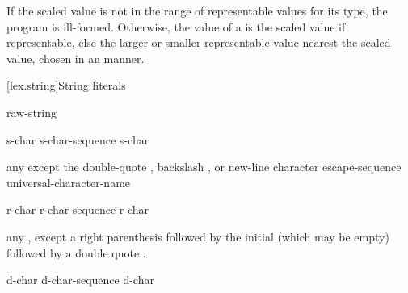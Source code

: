 \documentclass{wg21}
\begin{document}
\pnum
If the scaled value is not in the range of representable
values for its type, the program is ill-formed.
Otherwise, the value of a 
is the scaled value if representable,
else the larger or smaller representable value nearest the scaled value,
chosen in an  manner.

[lex.string]{String literals}

%
\begin{bnf}
    \br
       \br
      raw-string
\end{bnf}

\begin{bnf}
    \br
    s-char\br
    s-char-sequence s-char
\end{bnf}

\begin{bnf}
    \br
    \textnormal{any  except the double-quote , backslash \terminal{\textbackslash}, or new-line character}\br
    escape-sequence\br
    universal-character-name
\end{bnf}

\begin{bnf}
    \br
      \terminal{(}  \terminal{)}  
\end{bnf}

\begin{bnf}
    \br
    r-char\br
    r-char-sequence r-char
\end{bnf}

\begin{bnf}
    \br
    \textnormal{any , except a right parenthesis \terminal{)} followed by}\br
    \bnfindent\textnormal{the initial  (which may be empty) followed by a double quote .}
\end{bnf}

\begin{bnf}
    \br
    d-char\br
    d-char-sequence d-char
\end{bnf}
\end{document}
